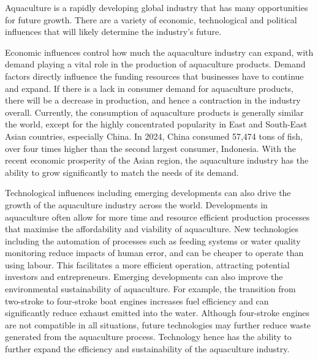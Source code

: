 	Aquaculture is a rapidly developing global industry that has many opportunities for future growth. There are a variety of economic, technological and political influences that will likely determine the industry's future.

	Economic influences control how much the aquaculture industry can expand, with demand playing a vital role in the production of aquaculture products. Demand factors directly influence the funding resources that businesses have to continue and expand. If there is a lack in consumer demand for aquaculture products, there will be a decrease in production, and hence a contraction in the industry overall. Currently, the consumption of aquaculture products is generally similar the world, except for the highly concentrated popularity in East and South-East Asian countries, especially China. In 2024, China consumed 57,474 tons of fish, over four times higher than the second largest consumer, Indonesia. With the recent economic prosperity of the Asian region, the aquaculture industry has the ability to grow significantly to match the needs of its demand.

	Technological influences including emerging developments can also drive the growth of the aquaculture industry across the world. Developments in aquaculture often allow for more time and resource efficient production processes that maximise the affordability and viability of aquaculture. New technologies including the automation of processes such as feeding systems or water quality monitoring reduce impacts of human error, and can be cheaper to operate than using labour. This facilitates a more efficient operation, attracting potential investors and entrepreneurs. Emerging developments can also improve the environmental sustainability of aquaculture. For example, the transition from two-stroke to four-stroke boat engines increases fuel efficiency and can significantly reduce exhaust emitted into the water. Although four-stroke engines are not compatible in all situations, future technologies may further reduce waste generated from the aquaculture process. Technology hence has the ability to further expand the efficiency and sustainability of the aquaculture industry.

